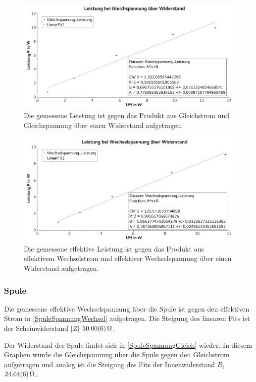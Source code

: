 \documentclass[
	a4paper,
	12pt,
	pagesize,
	ngerman
]{scrartcl}
\begin{document}
	\begin{figure}[tb]
		\includegraphics[width=1\textwidth]{WiderLeistungGleich}
		\centering
		\caption{Die gemessene Leistung ist gegen das Produkt aus Gleichstrom und Gleichspannung über einen Widerstand aufgetragen.} 
		\label{WiderLeistungGleich}
		\centering
	\end{figure}
	
	\begin{figure}[tb]
		\includegraphics[width=1\textwidth]{WiderLeistungWechsel}
		\centering
		\caption{Die gemessene effektive Leistung ist gegen das Produkt aus effektivem Wechselstrom und effektiver Wechselspannung über einen Widerstand aufgetragen.}
		\label{WiderLeistungWechsel}
		\centering
	\end{figure}

	\subsubsection*{Spule}
	Die gemessene effektive Wechselspannung über die Spule ist gegen den effektiven Strom in \cref{SpuleSpannungWechsel} aufgetragen.
	Die Steigung des linearen Fits ist der Scheinwiderstand $|Z|$ $\SI{30,00 \pm 0,06}{\Omega}$. 
	
	Der Widerstand der Spule findet sich in \cref{SpuleSpannungGleich} wieder. 
	In diesem Graphen wurde die Gleichspannung über die Spule gegen den Gleichstrom aufgetragen und analog ist die Steigung des Fits der Innenwiderstand $R_\text{i}$ $\SI{24,04 \pm 0,06}{\Omega}$.
\end{document}
